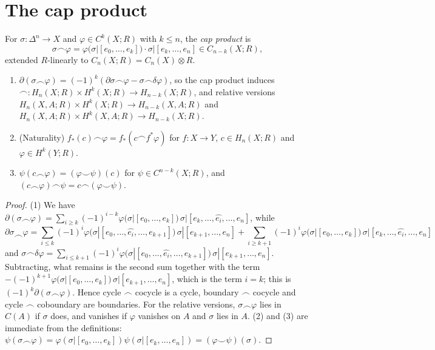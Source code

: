 \section{The cap product}\label{singular-homology:section-cap}

\begin{definition}\label{singular-homology:definition-cap}
For $\sigma \colon \Delta^n \to X$ and $\varphi \in C^k(X; R)$ with $k \leq n$, the \emph{cap product} is
\[
\sigma \frown \varphi = \varphi(\sigma|[e_0, \ldots, e_k]) \cdot \sigma|[e_k, \ldots, e_n] \in C_{n-k}(X; R),
\]
extended $R$-linearly to $C_n(X; R) = C_n(X) \otimes R$.
\end{definition}

\begin{proposition}\label{singular-homology:proposition-cap}
\begin{enumerate}
\item $\partial(\sigma \frown \varphi) = (-1)^k(\partial\sigma \frown \varphi - \sigma \frown \delta\varphi)$, so the cap product induces
$\frown \colon H_n(X; R) \times H^k(X; R) \to H_{n-k}(X; R)$, and relative versions $H_n(X, A; R) \times H^k(X; R) \to H_{n-k}(X, A; R)$ and
$H_n(X, A; R) \times H^k(X, A; R) \to H_{n-k}(X; R)$.
\item (Naturality) $f_*(c) \frown \varphi = f_*(c \frown f^*\varphi)$ for $f \colon X \to Y$, $c \in H_n(X; R)$ and $\varphi \in H^k(Y; R)$.
\item $\psi(c \frown \varphi) = (\varphi \smile \psi)(c)$ for $\psi \in C^{n-k}(X; R)$, and $(c \frown \varphi) \frown \psi = c \frown (\varphi \smile \psi)$.
\end{enumerate}
\end{proposition}

\begin{proof}
(1) We have
$\partial(\sigma \frown \varphi) = \sum_{i \geq k}(-1)^{i-k}\varphi(\sigma|[e_0, \ldots, e_k])\,\sigma|[e_k, \ldots, \widehat{e_i}, \ldots, e_n]$, while
\[
\partial\sigma \frown \varphi = \sum_{i \leq k}(-1)^i\varphi(\sigma|[e_0, \ldots, \widehat{e_i}, \ldots, e_{k+1}])\,\sigma|[e_{k+1}, \ldots, e_n]
+ \sum_{i \geq k+1}(-1)^i\varphi(\sigma|[e_0, \ldots, e_k])\,\sigma|[e_k, \ldots, \widehat{e_i}, \ldots, e_n]
\]
and $\sigma \frown \delta\varphi = \sum_{i \leq k+1}(-1)^i\varphi(\sigma|[e_0, \ldots, \widehat{e_i}, \ldots, e_{k+1}])\,\sigma|[e_{k+1}, \ldots, e_n]$. Subtracting, what remains is the
second sum together with the term $-(-1)^{k+1}\varphi(\sigma|[e_0, \ldots, e_k])\,\sigma|[e_{k+1}, \ldots, e_n]$, which is the term $i = k$; this is
$(-1)^k\partial(\sigma \frown \varphi)$. Hence cycle $\frown$ cocycle is a cycle, boundary $\frown$ cocycle and cycle $\frown$ coboundary are boundaries. For the relative
versions, $\sigma \frown \varphi$ lies in $C(A)$ if $\sigma$ does, and vanishes if $\varphi$ vanishes on $A$ and $\sigma$ lies in $A$. (2) and (3) are immediate from the
definitions: $\psi(\sigma \frown \varphi) = \varphi(\sigma|[e_0, \ldots, e_k])\psi(\sigma|[e_k, \ldots, e_n]) = (\varphi \smile \psi)(\sigma)$.
\end{proof}

